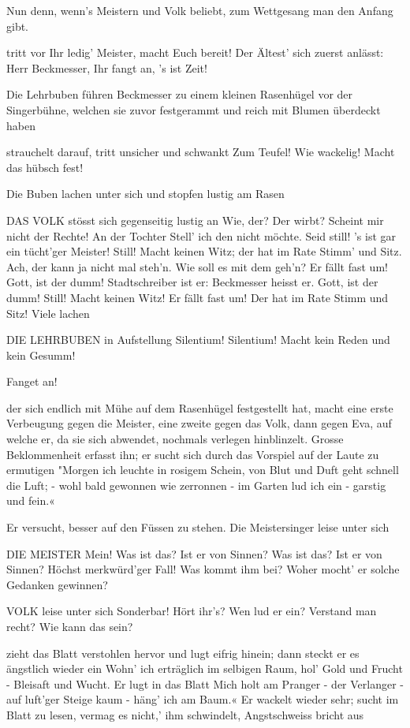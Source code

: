 \begin{drama}
\Sachsspeaks
Nun denn, wenn's Meistern und Volk beliebt,
zum Wettgesang man den Anfang gibt.

\Kothnerspeaks
tritt vor
Ihr ledig' Meister, macht Euch bereit!
Der Ältest' sich zuerst anlässt:
Herr Beckmesser, Ihr fangt an, 's ist Zeit!

Die Lehrbuben führen Beckmesser zu einem kleinen Rasenhügel vor der Singerbühne, welchen sie zuvor festgerammt und reich mit Blumen überdeckt haben

\Beckmesserspeaks
strauchelt darauf, tritt unsicher und schwankt
Zum Teufel! Wie wackelig! Macht das hübsch fest!

Die Buben lachen unter sich und stopfen lustig am Rasen

DAS VOLK
stösst sich gegenseitig lustig an
Wie, der? Der wirbt? Scheint mir nicht der Rechte!
An der Tochter Stell' ich den nicht möchte.
Seid still! 's ist gar ein tücht'ger Meister!
Still! Macht keinen Witz;
der hat im Rate Stimm' und Sitz.
Ach, der kann ja nicht mal steh'n.
Wie soll es mit dem geh'n?
Er fällt fast um! Gott, ist der dumm!
Stadtschreiber ist er:
Beckmesser heisst er.
Gott, ist der dumm!
Still! Macht keinen Witz!
Er fällt fast um!
Der hat im Rate Stimm und Sitz!
Viele lachen

DIE LEHRBUBEN
in Aufstellung
Silentium! Silentium!
Macht kein Reden und kein Gesumm!

\Kothnerspeaks
Fanget an!

\Beckmesserspeaks
der sich endlich mit Mühe auf dem Rasenhügel festgestellt hat, macht eine erste Verbeugung gegen die Meister, eine zweite gegen das Volk, dann gegen Eva, auf welche er, da sie sich abwendet, nochmals verlegen hinblinzelt. Grosse Beklommenheit erfasst ihn; er sucht sich durch das Vorspiel auf der Laute zu ermutigen
"Morgen ich leuchte in rosigem Schein,
von Blut und Duft geht schnell die Luft; -
wohl bald gewonnen wie zerronnen -
im Garten lud ich ein - garstig und fein.«

Er versucht, besser auf den Füssen zu stehen. Die Meistersinger leise unter sich

DIE MEISTER
Mein! Was ist das?
Ist er von Sinnen?
Was ist das?
Ist er von Sinnen?
Höchst merkwürd'ger Fall! Was kommt ihm bei?
Woher mocht' er solche Gedanken gewinnen?

VOLK
leise unter sich
Sonderbar! Hört ihr's? Wen lud er ein?
Verstand man recht? Wie kann das sein?

\Beckmesserspeaks
zieht das Blatt verstohlen hervor und lugt eifrig hinein; dann steckt er es ängstlich wieder ein
Wohn' ich erträglich im selbigen Raum,
hol' Gold und Frucht - Bleisaft und Wucht.
Er lugt in das Blatt
Mich holt am Pranger - der Verlanger -
auf luft'ger Steige kaum - häng' ich am Baum.«
Er wackelt wieder sehr; sucht im Blatt zu lesen, vermag es nicht,' ihm schwindelt, Angstschweiss bricht aus


\end{drama}

